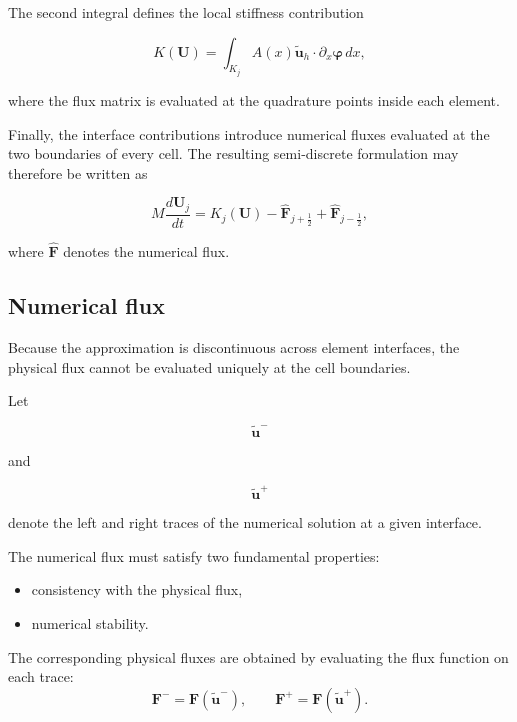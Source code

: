 \documentclass[11pt,a4paper]{report}
\theoremstyle{plain}
\theoremstyle{definition}
\begin{document}
The second integral defines the local stiffness contribution

\begin{equation}
K(\mathbf U)
=
\int_{K_j}
A(x)\tilde{\mathbf u}_h
\cdot
\partial_x\boldsymbol\varphi
\,dx,
\end{equation}

where the flux matrix is evaluated at the quadrature points inside each
element.

Finally, the interface contributions introduce numerical fluxes evaluated at
the two boundaries of every cell. The resulting semi-discrete formulation may
therefore be written as

\begin{equation}
M
\frac{d\mathbf U_j}{dt}
=
K_j(\mathbf U)
-
\widehat{\mathbf F}_{j+\frac12}
+
\widehat{\mathbf F}_{j-\frac12},
\label{eq:semi_discrete}
\end{equation}

where
\(\widehat{\mathbf F}\)
denotes the numerical flux.


\subsection{Numerical flux}

Because the approximation is discontinuous across element interfaces, the
physical flux cannot be evaluated uniquely at the cell boundaries.

Let

\[
\tilde{\mathbf u}^-
\]

and

\[
\tilde{\mathbf u}^+
\]

denote the left and right traces of the numerical solution at a given
interface.

The numerical flux must satisfy two fundamental properties:

\begin{itemize}
\item consistency with the physical flux,

\item numerical stability.
\end{itemize}

The corresponding physical fluxes are obtained by evaluating the flux function
on each trace:
\begin{equation}
\mathbf F^-
=
\mathbf F\!\left(\tilde{\mathbf u}^-\right),
\qquad
\mathbf F^+
=
\mathbf F\!\left(\tilde{\mathbf u}^+\right).
\end{equation}
\end{document}
